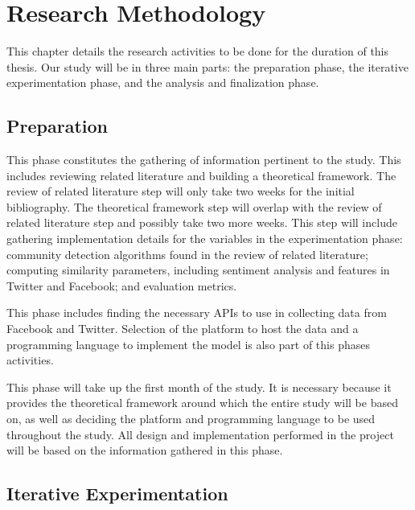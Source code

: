 %
%
%                 

\chapter{Research Methodology}
This chapter details the research activities to be done for the duration of this thesis. Our study will be in three main parts: the preparation phase, the iterative experimentation phase, and the analysis and finalization phase.

\section{Preparation}

This phase constitutes the gathering of information pertinent to the study. This includes reviewing related literature and building a theoretical framework. The review of related literature step will only take two weeks for the initial bibliography. The theoretical framework step will overlap with the review of related literature step and possibly take two more weeks. This step will include gathering implementation details for the variables in the experimentation phase: community detection algorithms found in the review of related literature; computing similarity parameters, including sentiment analysis and features in Twitter and Facebook; and evaluation metrics. 

This phase includes finding the necessary API\vtick s to use in collecting data from Facebook and Twitter. Selection of the platform to host the data and a programming language to implement the model is also part of this phase\vtick s activities. 

This phase will take up the first month of the study. It is necessary because it provides the theoretical framework around which the entire study will be based on, as well as deciding the platform and programming language to be used throughout the study. All design and implementation performed in the project will be based on the information gathered in this phase.

\section{Iterative Experimentation}

